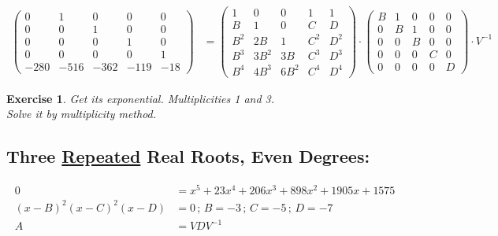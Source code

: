 \documentclass[12pt,a4paper]{article}
\newtheorem{exercise}{Exercise}[section]
\begin{document}
\begin{align}
\left( \begin{matrix} 0&1&0&0&0 \\ 0&0&1&0&0 \\ 0&0&0&1&0 \\ 0&0&0&0&1 \\ -280 & -516 & -362 & -119 & -18 \end{matrix} \right)
&=
\left( \begin{matrix} 1&0&0&1&1 \\ B&1&0&C&D \\ B^2&2B&1&C^2&D^2 \\ B^3&3B^2&3B&C^3&D^3 \\ B^4&4B^3&6B^2&C^4&D^4 \end{matrix} \right) \cdot
\left( \begin{matrix} B & 1&0&0&0 \\ 0 & B&1&0&0 \\ 0 & 0 & B & 0 & 0 \\ 0 & 0 & 0 & C & 0 \\ 0 & 0 & 0 & 0 & D \end{matrix} \right) \cdot V^{-1}
\end{align}

\begin{exercise}
Get its exponential. Multiplicities 1 and 3. \\
Solve it by multiplicity method.
\end{exercise}

\subsection{Three \href{}{Repeated} Real Roots, Even Degrees:}

\begin{align}
0 &= x^5 + 23 x^4 + 206 x^3 + 898 x^2 + 1905 x + 1575 \\
(x - B)^2 (x - C)^2 (x - D) &= 0\,;\,B = -3\,;\,C = -5\,;\,D = -7 \\
A &= VDV^{-1}
\end{align}
\end{document}
